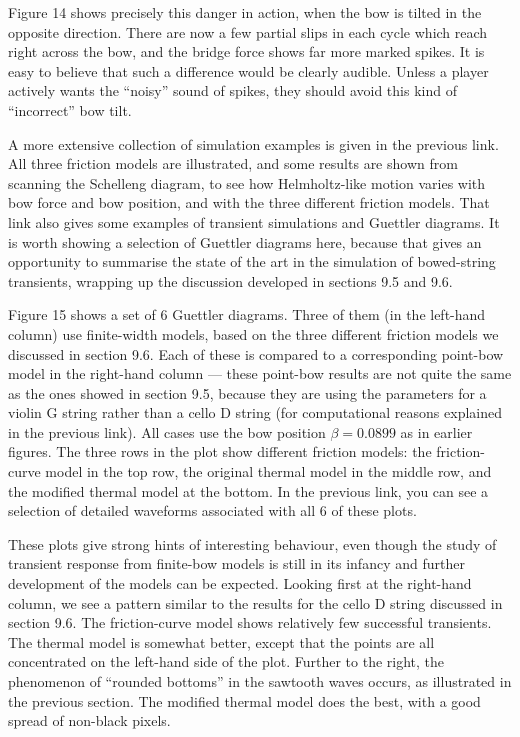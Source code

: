   Figure 14 shows precisely this danger in action, when the bow is tilted in 
  the opposite direction. There are now a few partial slips in each cycle which 
  reach right across the bow, and the bridge force shows far more marked 
  spikes. It is easy to believe that such a difference would be clearly 
  audible. Unless a player actively wants the “noisy” sound of spikes, they 
  should avoid this kind of “incorrect” bow tilt. 

  A more extensive collection of simulation examples is given in the previous 
  link. All three friction models are illustrated, and some results are shown 
  from scanning the Schelleng diagram, to see how Helmholtz-like motion varies 
  with bow force and bow position, and with the three different friction 
  models. That link also gives some examples of transient simulations and 
  Guettler diagrams. It is worth showing a selection of Guettler diagrams here, 
  because that gives an opportunity to summarise the state of the art in the 
  simulation of bowed-string transients, wrapping up the discussion developed 
  in sections 9.5 and 9.6. 

  Figure 15 shows a set of 6 Guettler diagrams. Three of them (in the left-hand 
  column) use finite-width models, based on the three different friction models 
  we discussed in section 9.6. Each of these is compared to a corresponding 
  point-bow model in the right-hand column — these point-bow results are not 
  quite the same as the ones showed in section 9.5, because they are using the 
  parameters for a violin G string rather than a cello D string (for 
  computational reasons explained in the previous link). All cases use the bow 
  position $\beta = 0.0899$ as in earlier figures. The three rows in the plot 
  show different friction models: the friction-curve model in the top row, the 
  original thermal model in the middle row, and the modified thermal model at 
  the bottom. In the previous link, you can see a selection of detailed 
  waveforms associated with all 6 of these plots. 

  These plots give strong hints of interesting behaviour, even though the study 
  of transient response from finite-bow models is still in its infancy and 
  further development of the models can be expected. Looking first at the 
  right-hand column, we see a pattern similar to the results for the cello D 
  string discussed in section 9.6. The friction-curve model shows relatively 
  few successful transients. The thermal model is somewhat better, except that 
  the points are all concentrated on the left-hand side of the plot. Further to 
  the right, the phenomenon of “rounded bottoms” in the sawtooth waves occurs, 
  as illustrated in the previous section. The modified thermal model does the 
  best, with a good spread of non-black pixels. 

